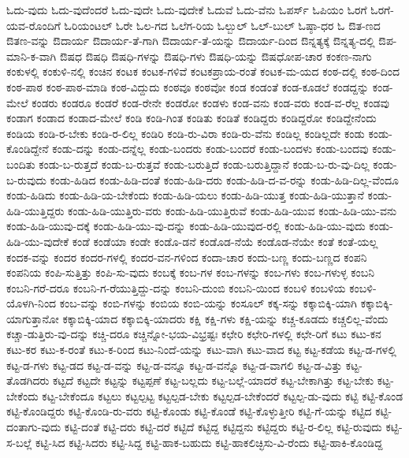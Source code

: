 {ಓದು-ವುದು
ಓದು-ವುದೆಂದರೆ
ಓದು-ವುದೇ
ಓದು-ವುದೇಕೆ
ಓದುವೆ
ಓದು-ವೆನು
ಓಪರ್ಸ್
ಓಪಿಯಂ
ಓರಗೆ
ಓರಗೆ-ಯವ-ರೊಂದಿಗೆ
ಓರಿಯಂಟಲ್
ಓರೇ
ಓಲ-ಗದ
ಓಲೆಗ-ರಿಯ
ಓಲ್ಬುಲ್
ಓಲ್-ಬುಲ್
ಓಷ್ಠಾ-ಧರ
ಓ
ಔತ-ಣದ
ಔತಣ-ವನ್ನು
ಔದಾರ್ಯ
ಔದಾರ್ಯ-ತೆ-ಗಾಗಿ
ಔದಾರ್ಯ-ತೆ-ಯನ್ನು
ಔದಾರ್ಯ-ದಿಂದ
ಔನ್ನತ್ಯಕ್ಕೆ
ಔನ್ನತ್ಯ-ದಲ್ಲಿ
ಔಪ-ಮಾನಿ-ಕ-ವಾಗಿ
ಔಷಧ
ಔಷಧಿ
ಔಷಧಿ-ಗಳನ್ನು
ಔಷಧಿ-ಗಳು
ಔಷಧಿ-ಯನ್ನು
ಔಷಧೋಪ-ಚಾರ
ಕಂಕಣ-ನಾಗು
ಕಂಕುಳಲ್ಲಿ
ಕಂಕುಳಿ-ನಲ್ಲಿ
ಕಂಚಿನ
ಕಂಟಕ
ಕಂಟಕ-ಗಳಿವೆ
ಕಂಟಕಪ್ರಾಯ-ರಂತೆ
ಕಂಟಕ-ಮ-ಯದ
ಕಂಠ-ದಲ್ಲಿ
ಕಂಠ-ದಿಂದ
ಕಂಠ-ಪಾಠ
ಕಂಠ-ಪಾಠ-ಮಾಡಿ
ಕಂಠ-ವಿದ್ದುದು
ಕಂಠವೂ
ಕಂಠವೋ
ಕಂಡ
ಕಂಡಂತೆ
ಕಂಡ-ಕೂಡಲೆ
ಕಂಡದ್ದನ್ನು
ಕಂಡ-ಮೇಲೆ
ಕಂಡರು
ಕಂಡರೂ
ಕಂಡರೆ
ಕಂಡ-ರೇನೇ
ಕಂಡರೋ
ಕಂಡಳು
ಕಂಡ-ವನು
ಕಂಡ-ವರು
ಕಂಡ-ವ-ರೆಲ್ಲ
ಕಂಡವು
ಕಂಡಾಗ
ಕಂಡಾದ
ಕಂಡಾದ-ಮೇಲೆ
ಕಂಡಿ
ಕಂಡಿ-ಗಿಂತ
ಕಂಡಿತು
ಕಂಡಿತೆ
ಕಂಡಿದ್ದರು
ಕಂಡಿದ್ದರೋ
ಕಂಡಿದ್ದೇನೆಂದು
ಕಂಡಿಯ
ಕಂಡಿ-ರ-ಬೇಕು
ಕಂಡಿ-ರ-ಲಿಲ್ಲ
ಕಂಡಿರಿ
ಕಂಡಿ-ರು-ವಿರಾ
ಕಂಡಿ-ರು-ವೆನು
ಕಂಡಿಲ್ಲ
ಕಂಡಿಲ್ಲದೇ
ಕಂಡು
ಕಂಡು-ಕೊಂಡಿದ್ದೇನೆ
ಕಂಡು-ದನ್ನು
ಕಂಡು-ದನ್ನೆಲ್ಲ
ಕಂಡು-ಬಂದರು
ಕಂಡು-ಬಂದರೆ
ಕಂಡು-ಬಂದಳು
ಕಂಡು-ಬಂದವು
ಕಂಡು-ಬಂದಿತು
ಕಂಡು-ಬ-ರುತ್ತದೆ
ಕಂಡು-ಬ-ರುತ್ತವೆ
ಕಂಡು-ಬರುತ್ತಿದೆ
ಕಂಡು-ಬರುತ್ತಿದ್ದಾನೆ
ಕಂಡು-ಬ-ರು-ವು-ದಿಲ್ಲ
ಕಂಡು-ಬ-ರುವುದು
ಕಂಡು-ಹಿಡಿದ
ಕಂಡು-ಹಿಡಿ-ದಂತೆ
ಕಂಡು-ಹಿಡಿ-ದರು
ಕಂಡು-ಹಿಡಿ-ದ-ವ-ರನ್ನು
ಕಂಡು-ಹಿಡಿ-ದಿಲ್ಲ-ವೆಂದೂ
ಕಂಡು-ಹಿಡಿದು
ಕಂಡು-ಹಿಡಿ-ಯ-ಬೇಕೆಂದು
ಕಂಡು-ಹಿಡಿ-ಯಲು
ಕಂಡು-ಹಿಡಿ-ಯುತ್ತ
ಕಂಡು-ಹಿಡಿ-ಯುತ್ತಾನೆ
ಕಂಡು-ಹಿಡಿ-ಯುತ್ತಿದ್ದರು
ಕಂಡು-ಹಿಡಿ-ಯುತ್ತಿರು-ವರು
ಕಂಡು-ಹಿಡಿ-ಯುತ್ತಿರುವೆ
ಕಂಡು-ಹಿಡಿ-ಯುವ
ಕಂಡು-ಹಿಡಿ-ಯು-ವನು
ಕಂಡು-ಹಿಡಿ-ಯುವು-ದಕ್ಕೆ
ಕಂಡು-ಹಿಡಿ-ಯು-ವು-ದನ್ನು
ಕಂಡು-ಹಿಡಿ-ಯುವುದ-ರಲ್ಲಿ
ಕಂಡು-ಹಿಡಿ-ಯು-ವುದು
ಕಂಡು-ಹಿಡಿ-ಯು-ವುದೇಕೆ
ಕಂಡೆ
ಕಂಡೆಯಾ
ಕಂಡೇ
ಕಂಡೊ-ಡನೆ
ಕಂಡೊಡ-ನೆಯೆ
ಕಂಡೊಡ-ನೆಯೇ
ಕಂತೆ
ಕಂತೆ-ಯಲ್ಲ
ಕಂದಕ-ವನ್ನು
ಕಂದರ
ಕಂದರ-ಗಳಲ್ಲಿ
ಕಂದರ-ವನ-ಗಳಿಂದ
ಕಂದಾ-ಚಾರ
ಕಂದು-ಬಣ್ಣ
ಕಂದು-ಬಣ್ಣದ
ಕಂಪನಿ
ಕಂಪನಿಯ
ಕಂಪಿ-ಸುತ್ತಿತ್ತು
ಕಂಪಿ-ಸು-ವುದು
ಕಂಬಕ್ಕೆ
ಕಂಬ-ಗಳ
ಕಂಬ-ಗಳನ್ನು
ಕಂಬ-ಗಳು
ಕಂಬ-ಗಳುಳ್ಳ
ಕಂಬನಿ
ಕಂಬನಿ-ಗರೆ-ದರೂ
ಕಂಬನಿ-ಗ-ರೆಯುತ್ತಿದ್ದು-ದನ್ನು
ಕಂಬನಿ-ದುಂಬಿ
ಕಂಬನಿ-ಯಿಂದ
ಕಂಬಳಿ
ಕಂಬಳಿಯ
ಕಂಬಳಿ-ಯೊಳಗಿ-ನಿಂದ
ಕಂಬ-ವನ್ನು
ಕಂಬಿ-ಗಳನ್ನು
ಕಂಬಿಯ
ಕಂಬಿ-ಯನ್ನು
ಕಂಸೂಲ್
ಕಕ್ಕ-ಸನ್ನು
ಕಕ್ಕಾಬಿಕ್ಕಿ-ಯಾಗಿ
ಕಕ್ಕಾಬಿಕ್ಕಿ-ಯಾಗುತ್ತಾನೋ
ಕಕ್ಕಾಬಿಕ್ಕಿ-ಯಾದ
ಕಕ್ಕಾಬಿಕ್ಕಿ-ಯಾದರು
ಕಕ್ಷಿ
ಕಕ್ಷಿ-ಗಳು
ಕಕ್ಷಿ-ಯನ್ನು
ಕಚ್ಚ-ಕೂಡದು
ಕಚ್ಚಲಿಲ್ಲ-ವೆಂದು
ಕಚ್ಚಾ-ಡುತ್ತಿರು-ವು-ದನ್ನು
ಕಚ್ಚಿ-ದರೂ
ಕಚ್ಚಿನ್ನೋ-ಭಯ-ವಿಭ್ರಷ್ಟಃ
ಕಛೇರಿ
ಕಛೇರಿ-ಗಳಲ್ಲಿ
ಕಛೇ-ರಿಗೆ
ಕಟು
ಕಟು-ಕನ
ಕಟು-ಕರ
ಕಟು-ಕ-ರಂತೆ
ಕಟು-ಕ-ರಿಂದ
ಕಟು-ನಿಂದೆ-ಯನ್ನು
ಕಟು-ವಾಗಿ
ಕಟು-ವಾದ
ಕಟ್ಟ
ಕಟ್ಟ-ಕಡೆಯ
ಕಟ್ಟ-ಡ-ಗಳಲ್ಲಿ
ಕಟ್ಟ-ಡ-ಗಳು
ಕಟ್ಟ-ಡದ
ಕಟ್ಟ-ಡ-ವನ್ನು
ಕಟ್ಟ-ಡ-ವನ್ನೂ
ಕಟ್ಟ-ಡ-ವನ್ನೊ
ಕಟ್ಟ-ಡ-ವಾಗಲಿ
ಕಟ್ಟ-ಡ-ವಿತ್ತು
ಕಟ್ಟ-ತೊಡಗಿದರು
ಕಟ್ಟದೆ
ಕಟ್ಟದೇ
ಕಟ್ಟನ್ನು
ಕಟ್ಟಪ್ಪಣೆ
ಕಟ್ಟ-ಬಲ್ಲದು
ಕಟ್ಟ-ಬಲ್ಲೆ-ಯಾದರೆ
ಕಟ್ಟ-ಬೇಕಾಗಿತ್ತು
ಕಟ್ಟ-ಬೇಕು
ಕಟ್ಟ-ಬೇಕೆಂದು
ಕಟ್ಟ-ಬೇಕೆಂದೂ
ಕಟ್ಟಲು
ಕಟ್ಟಲ್ಪಟ್ಟ
ಕಟ್ಟಲ್ಪಡ-ಬೇಕು
ಕಟ್ಟಲ್ಪಡ-ಬೇಕೆಂದರೆ
ಕಟ್ಟಲ್ಪ-ಡು-ವುದು
ಕಟ್ಟಿ
ಕಟ್ಟಿ-ಕೊಂಡ
ಕಟ್ಟಿ-ಕೊಂಡಿದ್ದರು
ಕಟ್ಟಿ-ಕೊಂಡಿ-ರು-ವರು
ಕಟ್ಟಿ-ಕೊಂಡು
ಕಟ್ಟಿ-ಕೊಂಡೆ
ಕಟ್ಟಿ-ಕೊಳ್ಳುತ್ತೀರಿ
ಕಟ್ಟಿ-ಗೆ-ಯನ್ನು
ಕಟ್ಟಿದ
ಕಟ್ಟಿ-ದಂತಾಗು-ವುದು
ಕಟ್ಟಿ-ದಂತೆ
ಕಟ್ಟಿ-ದರು
ಕಟ್ಟಿ-ದರೆ
ಕಟ್ಟಿದೆ
ಕಟ್ಟಿದ್ದ
ಕಟ್ಟಿದ್ದನು
ಕಟ್ಟಿದ್ದರು
ಕಟ್ಟಿ-ರ-ಲಿಲ್ಲ
ಕಟ್ಟಿ-ರುವುದು
ಕಟ್ಟಿ-ಸ-ಬಲ್ಲೆ
ಕಟ್ಟಿ-ಸಿದ
ಕಟ್ಟಿ-ಸಿದರು
ಕಟ್ಟಿ-ಸಿದ್ದ
ಕಟ್ಟಿ-ಹಾಕ-ಬಹುದು
ಕಟ್ಟಿ-ಹಾಕಲಿಚ್ಛಿಸು-ವಿ-ರೆಂದು
ಕಟ್ಟಿ-ಹಾಕಿ-ಕೊಂಡಿದ್ದ
}
